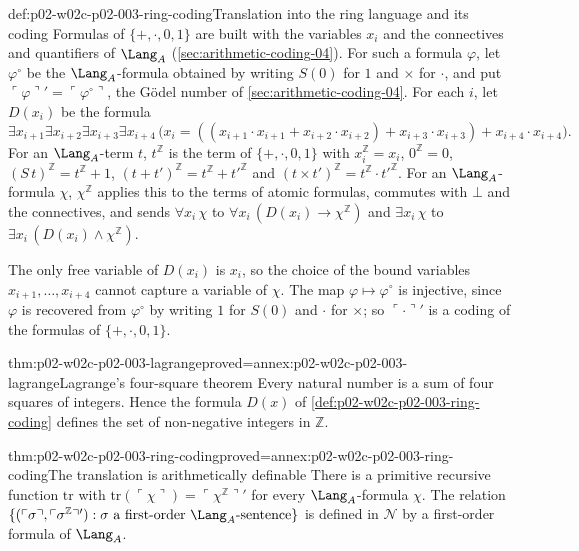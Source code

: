 \begin{hbdefinition}{def:p02-w02c-p02-003-ring-coding}{Translation into the ring language and its coding}
Formulas of \(\{+,\cdot,0,1\}\) are built with the variables \(x_i\) and the
connectives and quantifiers of \(\Lang_A\)
(\cref{sec:arithmetic-coding-04}).  For such a formula \(\varphi\), let
\(\varphi^{\circ}\) be the \(\Lang_A\)-formula obtained by writing
\(S(0)\) for \(1\) and \(\times\) for \(\cdot\), and put
\(\ulcorner\varphi\urcorner'=\ulcorner\varphi^{\circ}\urcorner\), the
G\"odel number of \cref{sec:arithmetic-coding-04}.  For each \(i\), let
\(D(x_i)\) be the formula
\[
 \exists x_{i+1}\exists x_{i+2}\exists x_{i+3}\exists x_{i+4}\,
 \bigl(x_i=((x_{i+1}\cdot x_{i+1}+x_{i+2}\cdot x_{i+2})
 +x_{i+3}\cdot x_{i+3})+x_{i+4}\cdot x_{i+4}\bigr).
\]
For an \(\Lang_A\)-term \(t\), \(t^{\mathbb Z}\) is the term of
\(\{+,\cdot,0,1\}\) with \(x_i^{\mathbb Z}=x_i\), \(0^{\mathbb Z}=0\),
\((S\,t)^{\mathbb Z}=t^{\mathbb Z}+1\),
\((t+t')^{\mathbb Z}=t^{\mathbb Z}+t'^{\mathbb Z}\) and
\((t\times t')^{\mathbb Z}=t^{\mathbb Z}\cdot t'^{\mathbb Z}\).  For an
\(\Lang_A\)-formula \(\chi\), \(\chi^{\mathbb Z}\) applies this to the
terms of atomic formulas, commutes with \(\bot\) and the connectives, and
sends \(\forall x_i\,\chi\) to \(\forall x_i\,(D(x_i)\to\chi^{\mathbb
Z})\) and \(\exists x_i\,\chi\) to \(\exists x_i\,(D(x_i)\land\chi^{\mathbb
Z})\).
\end{hbdefinition}

The only free variable of \(D(x_i)\) is \(x_i\), so the choice of the
bound variables \(x_{i+1},\ldots,x_{i+4}\) cannot capture a variable of
\(\chi\).  The map \(\varphi\mapsto\varphi^{\circ}\) is injective, since
\(\varphi\) is recovered from \(\varphi^{\circ}\) by writing \(1\) for
\(S(0)\) and \(\cdot\) for \(\times\); so
\(\ulcorner\cdot\urcorner'\) is a coding of the formulas of
\(\{+,\cdot,0,1\}\).

\begin{hbtheorem}{thm:p02-w02c-p02-003-lagrange}{proved=annex:p02-w02c-p02-003-lagrange}{Lagrange's four-square theorem}
Every natural number is a sum of four squares of integers.  Hence the
formula \(D(x)\) of \cref{def:p02-w02c-p02-003-ring-coding} defines the
set of non-negative integers in \(\mathbb Z\).
\end{hbtheorem}

\begin{hblemma}{thm:p02-w02c-p02-003-ring-coding}{proved=annex:p02-w02c-p02-003-ring-coding}{The translation is arithmetically definable}
There is a primitive recursive function \(\mathrm{tr}\) with
\(\mathrm{tr}(\ulcorner\chi\urcorner)=\ulcorner\chi^{\mathbb
Z}\urcorner'\) for every \(\Lang_A\)-formula \(\chi\).  The relation
\(\{(\ulcorner\sigma\urcorner,\ulcorner\sigma^{\mathbb
Z}\urcorner'):\sigma\text{ a first-order }\Lang_A\text{-sentence}\}\) is
defined in \(\mathcal N\) by a first-order formula of \(\Lang_A\).
\end{hblemma}

